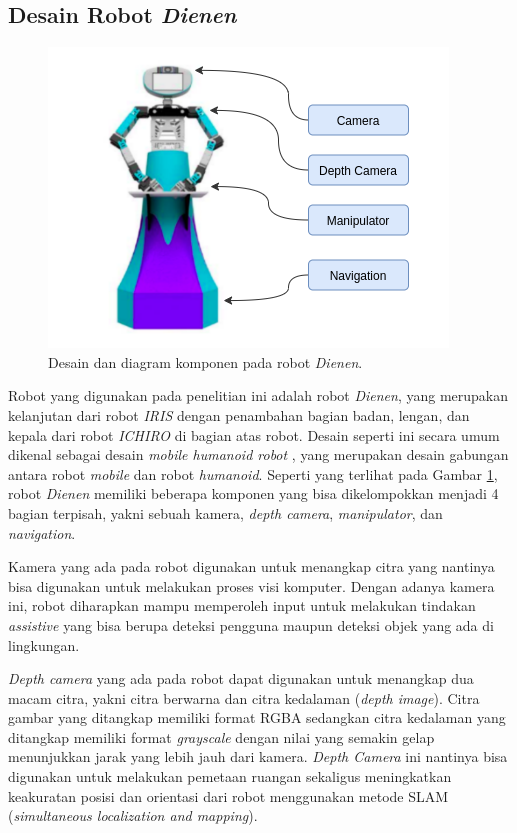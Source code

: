 \subsection{Desain Robot \emph{Dienen}}
\label{subsec:desainrobotdienen}

\begin{figure} [ht]
  \centering
  \includegraphics[scale=0.5]{gambar/komponen-robot.png}
  \caption{Desain dan diagram komponen pada robot \emph{Dienen}.}
  \label{fig:komponenrobot}
\end{figure}

Robot yang digunakan pada penelitian ini adalah robot \emph{Dienen},
  yang merupakan kelanjutan dari robot \emph{IRIS} \citep{cit:dikairono2020}\citep{cit:zanuar2019} dengan penambahan bagian badan, lengan, dan kepala dari robot \emph{ICHIRO} \citep{cit:muhtadin2019} di bagian atas robot.
Desain seperti ini secara umum dikenal sebagai desain \emph{mobile humanoid robot} \citep{cit:mohamed2012}, yang merupakan desain gabungan antara robot \emph{mobile} dan robot \emph{humanoid}.
Seperti yang terlihat pada Gambar \ref{fig:komponenrobot},
  robot \emph{Dienen} memiliki beberapa komponen yang bisa dikelompokkan menjadi 4 bagian terpisah, yakni sebuah kamera, \emph{depth camera}, \emph{manipulator}, dan \emph{navigation}.

Kamera yang ada pada robot digunakan untuk menangkap citra yang nantinya bisa digunakan untuk melakukan proses visi komputer.
Dengan adanya kamera ini, robot diharapkan mampu memperoleh input untuk melakukan tindakan \emph{assistive} yang bisa berupa deteksi pengguna maupun deteksi objek yang ada di lingkungan.

\emph{Depth camera} yang ada pada robot dapat digunakan untuk menangkap dua macam citra,
  yakni citra berwarna dan citra kedalaman (\emph{depth image}).
Citra gambar yang ditangkap memiliki format RGBA sedangkan citra kedalaman yang ditangkap memiliki format \emph{grayscale} dengan nilai yang semakin gelap menunjukkan jarak yang lebih jauh dari kamera.
\emph{Depth Camera} ini nantinya bisa digunakan untuk melakukan pemetaan ruangan sekaligus meningkatkan keakuratan posisi dan orientasi dari robot menggunakan metode SLAM (\emph{simultaneous localization and mapping}).

